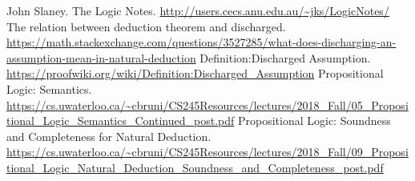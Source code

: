 \documentclass{article}
\theoremstyle{plain}
\theoremstyle{nonumberplain}
\begin{document}
\newpage
\begin{thebibliography}{00}
 John Slaney. The Logic Notes. \url{http://users.cecs.anu.edu.au/~jks/LogicNotes/}
 The relation between deduction theorem and discharged. \url{https://math.stackexchange.com/questions/3527285/what-does-discharging-an-assumption-mean-in-natural-deduction}
 Definition:Discharged Assumption. \url{https://proofwiki.org/wiki/Definition:Discharged_Assumption}
 Propositional Logic: Semantics. \url{https://cs.uwaterloo.ca/~cbruni/CS245Resources/lectures/2018_Fall/05_Propositional_Logic_Semantics_Continued_post.pdf}
 Propositional Logic: Soundness and
Completeness for Natural Deduction. \url{https://cs.uwaterloo.ca/~cbruni/CS245Resources/lectures/2018_Fall/09_Propositional_Logic_Natural_Deduction_Soundness_and_Completeness_post.pdf}
\end{thebibliography}
\end{document}
